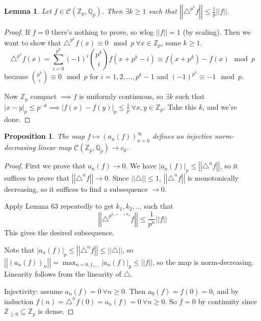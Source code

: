 \documentclass[a4paper]{article}
\newtheorem{lemma}[definition]{Lemma}
\newtheorem{prop}[definition]{Proposition}
\newcommand*\abs[1]{\left|#1\right|}
\newcommand*\norm[1]{\abs{\abs{#1}}}
\begin{document}
\begin{lemma}
	Let $f \in \mathcal{C}(\mathbb{Z}_p, \mathbb{Q}_p)$.
	Then $\exists k \geq 1$ such that $\norm{\triangle^{p^k}f} \leq \frac{1}{p}\norm{f}$.
\end{lemma}
\begin{proof}
	If $f=0$ there's nothing to prove,
	so wlog $\norm{f} = 1$ (by scaling).
	Then we want to show that $\triangle^{p^k} f(x) \equiv 0 \mod p\ \forall x \in \mathbb{Z}_p$,
	some $k \geq 1$.
	$$\triangle^{p^k} f(x) = \sum_{i=0}^{p^k}(-1)^i {p^k \choose i}f(x+p^k-i) \equiv f(x+p^k) - f(x) \mod p$$
	because ${p^k \choose i} \equiv 0 \mod p$ for $i=1,2,\dots,p^k-1$ and $(-1)^{p^k} \equiv -1 \mod p$.

	Now $\mathbb{Z}_p$ compact $\implies f$ is uniformly continuous,
	so $\exists k$ such that $\abs{x-y}_p \leq p^{-k} \implies \abs{f(x)-f(y)}_p \leq \frac{1}{p}\ \forall x,y \in \mathbb{Z}_p$.
	Take this $k$, and we're done.
\end{proof}

\begin{prop}
	The map $f \mapsto (a_n(f))_{n=0}^\infty$ defines an injective norm-decreasing linear map $\mathcal{C}(\mathbb{Z}_p,\mathbb{Q}_p) \to c_0$.
\end{prop}
\begin{proof}
	First we prove that $a_n(f) \to 0$.
	We have $\abs{a_n(f)}_p \leq \norm{\triangle^n f}$,
	so it suffices to prove that $\norm{\triangle^n f} \to 0$.
	Since $\norm{\triangle} \leq 1$,
	$\norm{\triangle^n f}$ is monotonically decreasing,
	so it suffices to find a subsequence $\to 0$.
	
	Apply Lemma 63 repeatedly to get $k_1, k_2, \dots$ such that
	$$\norm{\triangle^{p^{k_1 + \dots + k_n}}f} \leq \frac{1}{p^n}\norm{f}$$
	This gives the desired subsequence.
	
	Note that $\abs{a_n(f)}_p \leq \norm{\triangle^n f} \leq \norm{\triangle}$,
	so $\norm{(a_n(f))_n} = \max_{n=0,1,\dots}\abs{a_n(f)}_p \leq \norm{f}$,
	so the map is norm-decreasing. 
	Linearity follows from the linearity of $\triangle$.
	
	Injectivity: assume $a_n(f)=0\ \forall n \geq 0$.
	Then $a_0(f) = f(0) = 0$,
	and by induction $f(n) = \triangle^n f(0) = a_n(f) = 0\ \forall n\geq 0$.
	So $f=0$ by continuity since $\mathbb{Z}_{\geq 0} \subseteq \mathbb{Z}_p$ is dense.
\end{proof}
\end{document}
